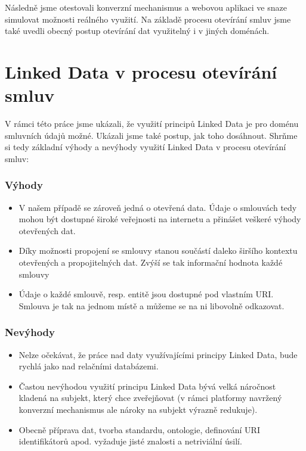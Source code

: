 Následně jsme otestovali konverzní mechanismus a webovou aplikaci ve snaze simulovat možnosti reálného využití. Na základě procesu otevírání smluv jsme také uvedli obecný postup otevírání dat využitelný i v jiných doménách.

\section*{Linked Data v procesu otevírání smluv}

V rámci této práce jsme ukázali, že využití principů Linked Data je pro doménu smluvních údajů možné. Ukázali jsme také postup, jak toho dosáhnout. Shrňme si tedy základní výhody a nevýhody využití Linked Data v procesu otevírání smluv:

\subsubsection*{Výhody}

\begin{itemize}
\item V našem případě se zároveň jedná o otevřená data. Údaje o smlouvách tedy mohou být dostupné široké veřejnosti na internetu a přinášet veškeré výhody otevřených dat. 
\item Díky možnosti propojení se smlouvy stanou součástí daleko širšího kontextu otevřených a  propojitelných dat. Zvýší se tak informační hodnota každé smlouvy
\item Údaje o každé smlouvě, resp. entitě jsou dostupné pod vlastním URI. Smlouva je tak na jednom místě a můžeme se na ni libovolně odkazovat.   
\end{itemize}

\subsubsection*{Nevýhody}

\begin{itemize}
\item Nelze očekávat, že práce nad daty využívajícími principy Linked Data, bude rychlá jako nad relačními databázemi. 
\item Častou nevýhodou využití principu Linked Data bývá velká náročnost kladená na subjekt, který chce zveřejňovat (v rámci platformy navržený konverzní mechanismus ale nároky na subjekt výrazně redukuje).
\item Obecně příprava dat, tvorba standardu, ontologie, definování URI identifikátorů apod. vyžaduje jisté znalosti a netriviální úsilí.  
\end{itemize}

